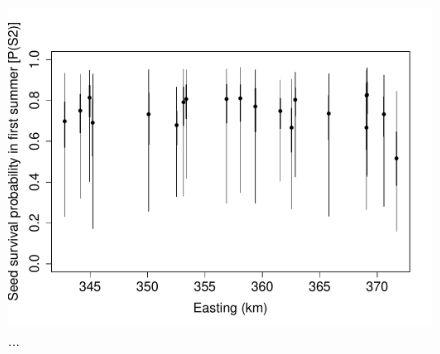 \documentclass[12pt, oneside, titlepage]{article}   	%
\begin{document}
 \begin{figure}[h]
   \centering
       \includegraphics[page=1,width=1\textwidth]{../figures/spatial-s2.pdf}  
    \caption{ ... }
 \label{fig:test}
\end{figure}
\end{document}
